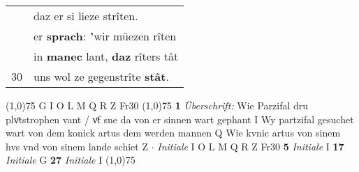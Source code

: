 \documentclass[8pt,a4paper,notitlepage]{article}
\begin{document}
\begin{table}[ht]
\begin{minipage}[t]{0.5\linewidth}
\begin{tabular}{rl}
 & daz er si lieze strîten.\\ 
 & er \textbf{sprach}: "wir müezen rîten\\ 
 & in \textbf{manec} lant, \textbf{daz} rîters tât\\ 
30 & uns wol ze gegenstrîte \textbf{stât}.\\ 
\end{tabular}
\scriptsize
\line(1,0){75} \newline
G I O L M Q R Z Fr30 \newline
\line(1,0){75} \newline
\textbf{1} \textit{Überschrift:} Wie Parzifal dru plvͦtstrophen vant / vͦf sne da von er sinnen wart gephant I  Wy partzifal gesuchet wart von dem konick artus dem werden mannen Q  Wie kvnic artus von sinem hvs vnd von sinem lande schiet Z   $\cdot$ \textit{Initiale} I O L M Q R Z Fr30  \textbf{5} \textit{Initiale} I  \textbf{17} \textit{Initiale} G  \textbf{27} \textit{Initiale} I  \newline
\line(1,0){75} \newline

\end{minipage}
\end{table}
\end{document}
